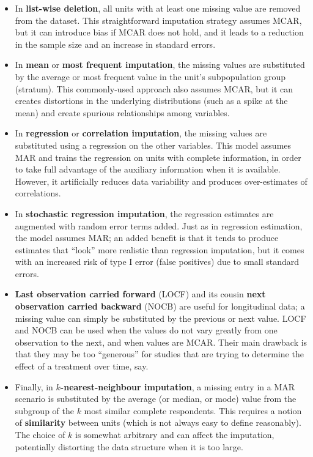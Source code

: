 \begin{itemize}[noitemsep]
\item In \textbf{list-wise deletion}, all units with at least one missing value are removed from the dataset. This straightforward imputation strategy assumes MCAR, but it can introduce bias if MCAR does not hold, and it leads to a reduction in the sample size and an increase in standard errors.
\item In \textbf{mean} or \textbf{most frequent imputation}, the missing values are substituted by the average or most frequent value in the unit's subpopulation group (stratum). This commonly-used approach also assumes MCAR, but it can creates distortions in the underlying distributions (such as a spike at the mean) and create spurious relationships among variables.
\item  In \textbf{regression} or \textbf{correlation imputation}, the missing values are substituted using a regression on the other variables. This model assumes MAR and trains the regression on units with complete information, in order to take full advantage of the auxiliary information when it is available. However, it artificially reduces data variability and produces over-estimates of correlations.
\item In \textbf{stochastic regression imputation}, the regression estimates are augmented with random error terms added. Just as in regression estimation, the model assumes MAR; an added benefit is that it tends to produce estimates that ``look'' more realistic than regression imputation, but it comes with an increased risk of type I error (false positives) due to small standard errors.
\item\textbf{Last observation carried forward} (LOCF) and its cousin \textbf{next observation carried backward} (NOCB) are useful for longitudinal data; a missing value can simply be substituted by the previous or next value. LOCF and NOCB can be used when the values do not vary greatly from one observation to the next, and when values are MCAR. Their main drawback is that they may be too ``generous'' for studies that are trying to determine the effect of a treatment over time, say. 
\item Finally, in \textbf{$k$-nearest-neighbour imputation}, a missing entry in a MAR scenario is substituted by the average (or median, or mode) value from the subgroup of the $k$ most similar complete respondents. This requires a notion of \textbf{similarity} between units (which is not always easy to define reasonably). The choice of $k$ is somewhat arbitrary and can affect the imputation, potentially distorting the data structure when it is too  large. 
\end{itemize}
